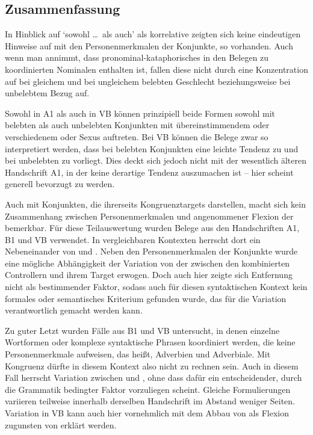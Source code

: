 
\subsection{Zusammenfassung}

In Hinblick auf  `sowohl \dots\ als auch' als
korrelative  zeigten sich keine eindeutigen
Hinweise auf  mit den Personenmerkmalen der
Konjunkte, so vorhanden. Auch wenn man annimmt, dass
pronominal-kataphorisches  in den Belegen zu
koordinierten Nominalen enthalten ist, fallen diese nicht
durch eine Konzentration auf  bei gleichem und  bei
ungleichem belebten Geschlecht beziehungsweise bei
unbelebtem Bezug auf.

Sowohl in A1 als auch in VB können prinzipiell beide Formen sowohl mit
belebten als auch unbelebten Konjunkten mit
über\-einstim\-mendem oder verschiedenem  oder Sexus auftreten. Bei
VB können die Belege zwar so interpretiert werden, dass bei
belebten Konjunkten eine leichte Tendenz zu  und bei
unbelebten zu  vorliegt. Dies deckt sich jedoch
nicht mit der wesentlich älteren Handschrift A1, in der keine derartige Tendenz
auszumachen ist -- hier scheint generell  bevorzugt zu werden.

Auch mit Konjunkten, die ihrerseits Kongruenztargets darstellen, macht sich
kein Zusammen\-hang zwischen Personen\-merkmalen und
angenommener Flexion der  bemerkbar. Für diese Teilauswertung
wurden Belege aus den Handschriften A1, B1 und VB verwendet. In vergleichbaren
Kontexten herrscht dort ein Nebeneinander von  und
. Neben den Personenmerkmalen der Konjunkte wurde eine mögliche
Abhängigkeit der Variation von der  zwischen den kombinierten
Controllern und ihrem Target erwogen. Doch auch hier zeigte sich
Entfernung nicht als bestimmender Faktor, sodass auch für diesen syntaktischen
Kontext kein formales oder semantisches Kriterium gefunden wurde, das für die
Variation verantwortlich gemacht werden kann.

Zu guter Letzt wurden Fälle aus B1 und VB untersucht, in denen einzelne
Wortformen oder komplexe syntaktische Phrasen koordiniert
werden, die keine Personenmerkmale aufweisen, das heißt,
Adverbien und Adverbiale. Mit Kongruenz dürfte in
diesem Kontext also nicht zu rechnen sein. Auch in diesem Fall herrscht
Variation zwischen  und , ohne dass dafür ein
entscheidender, durch die Grammatik bedingter Faktor vorzuliegen scheint.
Gleiche Formulierungen variieren teilweise innerhalb derselben Handschrift im
Abstand weniger Seiten. Variation in VB kann auch hier vornehmlich mit dem
Abbau von  als Flexion zugunsten von  erklärt werden.
